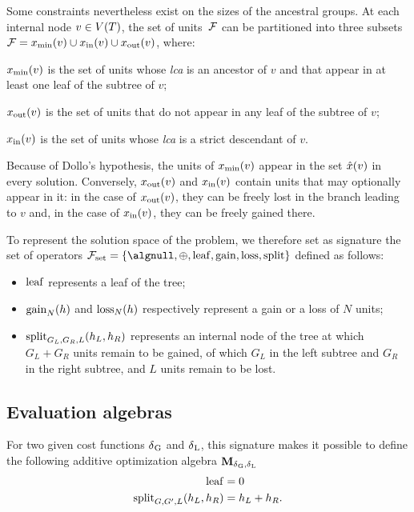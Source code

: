Some constraints nevertheless exist on the sizes of the ancestral groups.
At each internal node \(v \in V(T)\), the set of units~\(\mathcal{F}\) can be partitioned into three subsets \(\mathcal{F} = x_{\mathrm{min}}(v) \cup x_{\mathrm{in}}(v) \cup x_{\mathrm{out}}(v)\), where:
\begin{compactitemize}
    \item \(x_{\mathrm{min}}(v)\) is the set of units whose \emph{lca} is an ancestor of \(v\) and that appear in at least one leaf of the subtree of \(v\);
    \item \(x_{\mathrm{out}}(v)\) is the set of units that do not appear in any leaf of the subtree of \(v\);
    \item \(x_{\mathrm{in}}(v)\) is the set of units whose \emph{lca} is a strict descendant of \(v\).
\end{compactitemize}
Because of Dollo's hypothesis, the units of \(x_{\mathrm{min}}(v)\) appear in the set \(\hat{x}(v)\) in every solution.
Conversely, \(x_{\mathrm{out}}(v)\) and \(x_{\mathrm{in}}(v)\) contain units that may optionally appear in it: in the case of \(x_{\mathrm{out}}(v)\), they can be freely lost in the branch leading to \(v\) and, in the case of \(x_{\mathrm{in}}(v)\), they can be freely gained there.

To represent the solution space of the problem, we therefore set as signature the set of operators \(\algsignset = \{\algnull,\allowbreak \algplus,\allowbreak \evLeaf,\allowbreak \evGain,\allowbreak \evLoss,\allowbreak \evSplit\}\) defined as follows:
\begin{itemize}
    \item \(\mathrm{leaf}\) represents a leaf of the tree;
    \item \(\mathrm{gain}_N(h)\) and \(\mathrm{loss}_N(h)\) respectively represent a gain or a loss of \(N\) units;
    \item \(\mathrm{split}_{G_L,G_R,L}(h_L, h_R)\) represents an internal node of the tree at which \(G_L+G_R\) units remain to be gained, of which \(G_L\) in the left subtree and \(G_R\) in the right subtree, and \(L\) units remain to be lost.
\end{itemize}

\subsection{Evaluation algebras}

For two given cost functions \(\delta\kern.1pt_{\mathrm{G}}\) and \(\delta\kern.1pt_{\mathrm{L}}\), this signature makes it possible to define the following additive optimization algebra \(\mathbf{M}_{\delta\kern.1pt_{\mathrm{G}},\delta\kern.1pt_{\mathrm{L}}}\)\\
{
\begin{align*}
    \mathrm{leaf} &= 0 \\
    \mathrm{split}_{G,G',L}(h_L, h_R) &= h_L + h_R.
\end{align*}
}

